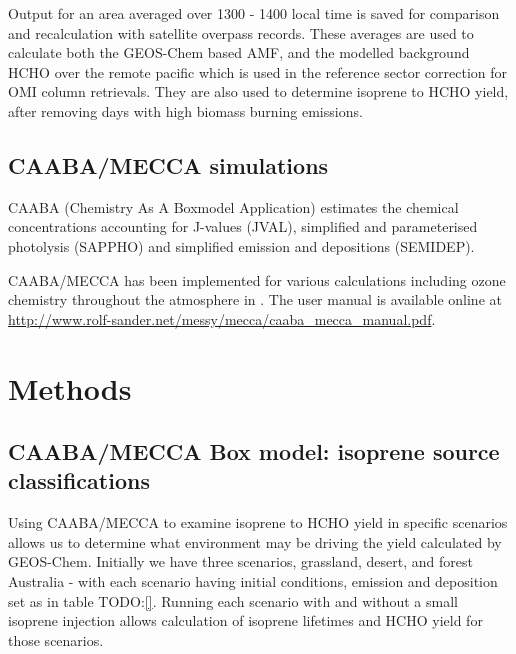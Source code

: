     Output for an area averaged over 1300 - 1400 local time is saved for comparison and recalculation with satellite overpass records.
    These averages are used to calculate both the GEOS-Chem based AMF, and the modelled background HCHO over the remote pacific which is used in the reference sector correction for OMI column retrievals.
    They are also used to determine isoprene to HCHO yield, after removing days with high biomass burning emissions.
  
  \subsection{CAABA/MECCA simulations}
    \label{BioIsop:Model:CM}
    
    CAABA (Chemistry As A Boxmodel Application) estimates the chemical concentrations accounting for J-values (JVAL), simplified and parameterised photolysis (SAPPHO) and simplified emission and depositions (SEMIDEP).
    
    CAABA/MECCA has been implemented for various calculations including ozone chemistry throughout the atmosphere in \cite{Zanis2014}.
    The user manual is available online at \url{http://www.rolf-sander.net/messy/mecca/caaba_mecca_manual.pdf}.
  
\section{Methods}
  \label{BioIsop:Methods}
  
  
  \subsection{CAABA/MECCA Box model: isoprene source classifications}
    \label{BioIsop:Methods:CM}
    
    Using CAABA/MECCA to examine isoprene to HCHO yield in specific scenarios allows us to determine what environment may be driving the yield calculated by GEOS-Chem.
    Initially we have three scenarios, grassland, desert, and forest Australia - with each scenario having initial conditions, emission and deposition set as in table TODO:\ref{}.
    Running each scenario with and without a small isoprene injection allows calculation of isoprene lifetimes and HCHO yield for those scenarios.
    
